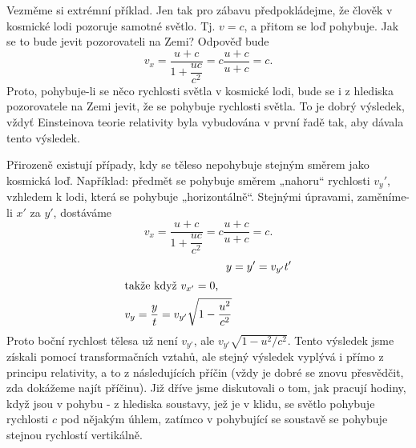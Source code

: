     Vezměme si extrémní příklad. Jen tak pro zábavu předpokládejme, že člověk v kosmické lodi 
    pozoruje samotné světlo. Tj. \(v = c\), a přitom se loď pohybuje. Jak se to bude jevit 
    pozorovateli na Zemi? Odpověď bude
    \begin{equation*}
      v_x = \dfrac{u + c}{1+\dfrac{uc}{c^2}} = c\dfrac{u+c}{u+c} = c.
    \end{equation*}
    Proto, pohybuje-li se něco rychlosti světla v kosmické lodi, bude se i z hlediska pozorovatele 
    na Zemi jevit, že se pohybuje rychlosti světla. To je dobrý výsledek, vždyť Einsteinova teorie 
    relativity byla vybudována v první řadě tak, aby dávala tento výsledek.
    
    Přirozeně existují případy, kdy se těleso nepohybuje stejným směrem jako kosmická loď. 
    Například: předmět se pohybuje směrem „nahoru“ rychlosti \(v_y'\), vzhledem k lodi, která se 
    pohybuje „horizontálně“. Stejnými úpravami, zaměníme-li \(x'\) za \(y'\), dostáváme
    \begin{equation*}
      v_x = \dfrac{u + c}{1+\dfrac{uc}{c^2}} = c\dfrac{u+c}{u+c} = c.
    \end{equation*}
    \begin{align}
      y &= y'= v_{y'}t'                                     \nonumber \\
      \shortintertext{takže když \(v_{x'} = 0\),} 
      v_y = \frac{y}{t} = v_{y'}\sqrt{1-\dfrac{u^2}{c^2}}   \label{fyz:eq210}
    \end{align}
    Proto boční rychlost tělesa už není \(v_{y'}\), ale \(v_{y'}\sqrt{1 - u^2/c^2}\). Tento 
    výsledek jsme získali pomocí transformačních vztahů, ale stejný výsledek vyplývá i přímo z 
    principu relativity, a to z následujících příčin (vždy je dobré se znovu přesvědčit, zda 
    dokážeme najít příčinu). Již dříve jsme diskutovali o tom, jak pracují hodiny, když jsou v 
    pohybu - z hlediska soustavy, jež je v klidu, se světlo pohybuje rychlosti \(c\) pod nějakým 
    úhlem, zatímco v pohybující se soustavě se pohybuje stejnou rychlostí vertikálně. 

